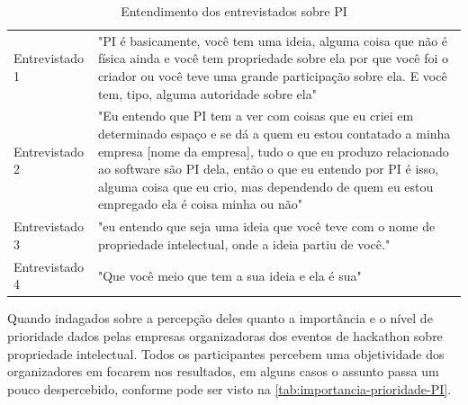\begin{table}[H]
\centering
\caption{Entendimento dos entrevistados sobre PI}
\label{tab:entendimento-PI}
\begin{tabular}{l|p{}}
Entrevistado 1 &
  "PI é basicamente, você tem uma ideia, alguma coisa que não é física ainda e você tem propriedade sobre ela por que você foi o criador ou você teve uma grande participação sobre ela. E você tem, tipo, alguma autoridade sobre ela" \\
Entrevistado 2 &
  "Eu entendo que PI tem a ver com coisas que eu criei em determinado espaço e se dá a quem eu estou contatado a minha empresa [nome da empresa], tudo o que eu produzo relacionado ao software são PI dela, então o que eu entendo por PI é isso, alguma coisa que eu crio, mas dependendo de quem eu estou empregado ela é coisa minha ou não" \\
Entrevistado 3 & "eu entendo que seja uma ideia que você teve com o nome de propriedade intelectual, onde a ideia partiu de você." \\
Entrevistado 4 & "Que você meio que tem a sua ideia e ela é sua"                                                                  
\end{tabular}
\end{table}



Quando indagados sobre a percepção deles quanto a importância e o nível de prioridade dados pelas empresas organizadoras dos eventos de hackathon sobre propriedade intelectual. 
Todos os participantes percebem uma objetividade dos organizadores em focarem nos resultados, em alguns casos o assunto passa um pouco despercebido, conforme pode ser visto na \autoref{tab:importancia-prioridade-PI}.

